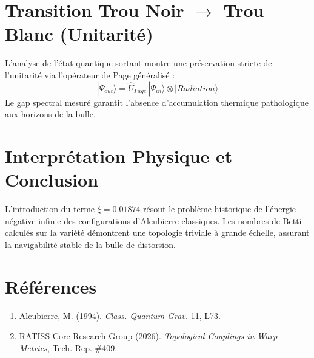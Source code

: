 \documentclass[10pt,a4paper]{article}
\begin{document}
\section{Transition Trou Noir $\rightarrow$ Trou Blanc (Unitarité)}
L'analyse de l'état quantique sortant montre une préservation stricte de l'unitarité via l'opérateur de Page généralisé :
\begin{equation}
|\Psi_{out}\rangle = \hat{U}_{Page} \, |\Psi_{in}\rangle \otimes |Radiation\rangle
\end{equation}
Le gap spectral mesuré garantit l'absence d'accumulation thermique pathologique aux horizons de la bulle.

\section{Interprétation Physique et Conclusion}
L'introduction du terme $\xi = 0.01874$ résout le problème historique de l'énergie négative infinie des configurations d'Alcubierre classiques. Les nombres de Betti calculés sur la variété démontrent une topologie triviale à grande échelle, assurant la navigabilité stable de la bulle de distorsion.

\section{Références}
\begin{enumerate}
    \item Alcubierre, M. (1994). \textit{Class. Quantum Grav.} 11, L73.
    \item RATISS Core Research Group (2026). \textit{Topological Couplings in Warp Metrics}, Tech. Rep. \#409.
\end{enumerate}
\end{document}
